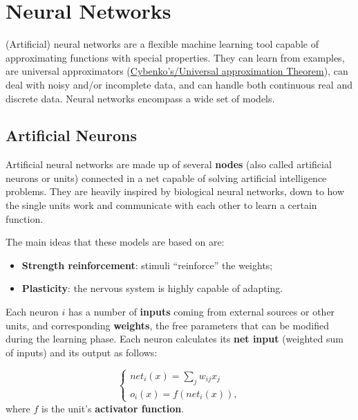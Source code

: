 \chapter{Neural Networks}

(Artificial) neural networks are a flexible machine learning tool capable of approximating functions with special properties. They can learn from examples, are universal approximators (\href{https://en.wikipedia.org/wiki/Universal_approximation_theorem}{Cybenko's/Universal approximation Theorem}), can deal with noisy and/or incomplete data, and can handle both continuous real and discrete data. Neural networks encompass a wide set of models.

\section{Artificial Neurons}

Artificial neural networks are made up of several \textbf{nodes} (also called artificial neurons or units) connected in a net capable of solving artificial intelligence problems. They are heavily inspired by biological neural networks, down to how the single units work and communicate with each other to learn a certain function.

The main ideas that these models are based on are:

\begin{itemize}
    \item \textbf{Strength reinforcement}: stimuli ``reinforce'' the weights;

    \item \textbf{Plasticity}: the nervous system is highly capable of adapting.
\end{itemize}

Each neuron $i$ has a number of \textbf{inputs} coming from external sources or other units, and corresponding \textbf{weights}, the free parameters that can be modified during the learning phase. Each neuron calculates its \textbf{net input} (weighted sum of inputs) and its output as follows:

\begin{equation*}
    \begin{cases}
        net_i(x) = \sum_j w_{ij} x_j \\
        o_i(x) = f(net_i(x)),
    \end{cases}
\end{equation*}
where $f$ is the unit's \textbf{activator function}.

